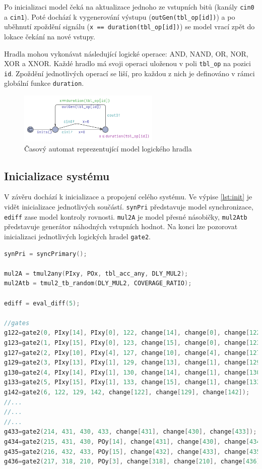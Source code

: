 Po inicializaci model čeká na aktualizace jednoho ze vstupních bitů (kanály \texttt{cin0} a \texttt{cin1}). Poté dochází k vygenerování výstupu (\texttt{outGen(tbl\_op[id])}) a po uběhnutí zpoždění signálu (\texttt{x == duration(tbl\_op[id])}) se model vrací zpět do lokace čekání na nové vstupy.

Hradla mohou vykonávat následující logické operace: AND, NAND, OR, NOR, XOR a XNOR. Každé hradlo má svoji operaci uloženou v poli \texttt{tbl\_op} na pozici \texttt{id}. Zpoždění jednotlivých operací se liší, pro každou z nich je definováno v rámci globální funkce \texttt{duration}.

\begin{figure}[H]
    \centering
    \includegraphics[width=0.6\textwidth]{obrazky-figures/model_gate2.png}
    \caption{Časový automat reprezentující model logického hradla}
    \label{fig:model_gate2}
\end{figure}

\subsection{Inicializace systému}
V závěru dochází k inicializace a propojení celého systému. Ve výpise \ref{lst:init} je vidět inicializace jednotlivých součástí. \texttt{synPri} představuje model synchronizace, \texttt{ediff} zase model kontroly rovnosti. \texttt{mul2A} je model přesné násobičky, \texttt{mul2Atb} představuje generátor náhodných vstupních hodnot. Na konci lze pozorovat inicializaci jednotlivých logických hradel \texttt{gate2}.

\begin{lstlisting}[language={C}, caption={Inicializace systému}, label={lst:init}]
synPri = syncPrimary();

mul2A = tmul2any(PIxy, POx, tbl_acc_any, DLY_MUL2);
mul2Atb = tmul2_tb_random(DLY_MUL2, COVERAGE_RATIO);

ediff = eval_diff(5);

//gates
g122=gate2(0, PIxy[14], PIxy[0], 122, change[14], change[0], change[122]);
g123=gate2(1, PIxy[15], PIxy[0], 123, change[15], change[0], change[123]);
g127=gate2(2, PIxy[10], PIxy[4], 127, change[10], change[4], change[127]);
g129=gate2(3, PIxy[13], PIxy[1], 129, change[13], change[1], change[129]);
g130=gate2(4, PIxy[14], PIxy[1], 130, change[14], change[1], change[130]);
g133=gate2(5, PIxy[15], PIxy[1], 133, change[15], change[1], change[133]);
g142=gate2(6, 122, 129, 142, change[122], change[129], change[142]);
//...
//...
//...
g433=gate2(214, 431, 430, 433, change[431], change[430], change[433]);
g434=gate2(215, 431, 430, POy[14], change[431], change[430], change[434]);
g435=gate2(216, 432, 433, POy[15], change[432], change[433], change[435]);
g436=gate2(217, 318, 210, POy[3], change[318], change[210], change[436]);
\end{lstlisting}

